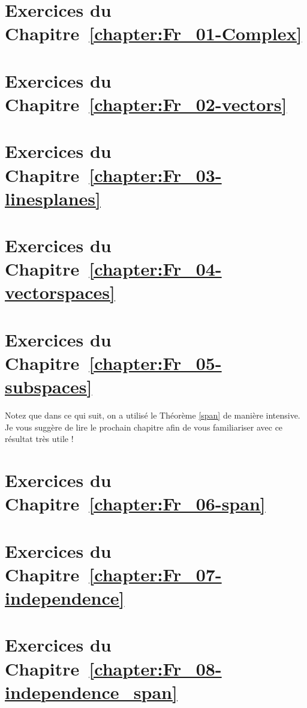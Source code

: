 

\section*{Exercices du Chapitre~\ref{chapter:Fr_01-Complex}}


\section*{Exercices du Chapitre~\ref{chapter:Fr_02-vectors}}
   
 
\section*{Exercices du Chapitre~\ref{chapter:Fr_03-linesplanes}}


\section*{Exercices du Chapitre~\ref{chapter:Fr_04-vectorspaces}}


 
\section*{Exercices du Chapitre~\ref{chapter:Fr_05-subspaces}}

Notez que dans ce qui suit, on a utilisé le Théorème \ref{span} de manière intensive.  Je vous suggère de lire le prochain chapitre afin de vous familiariser avec ce résultat très utile !
\medskip




\section*{Exercices du Chapitre~\ref{chapter:Fr_06-span}}




\section*{Exercices du Chapitre~\ref{chapter:Fr_07-independence}}


\section*{Exercices du Chapitre~\ref{chapter:Fr_08-independence_span}}



